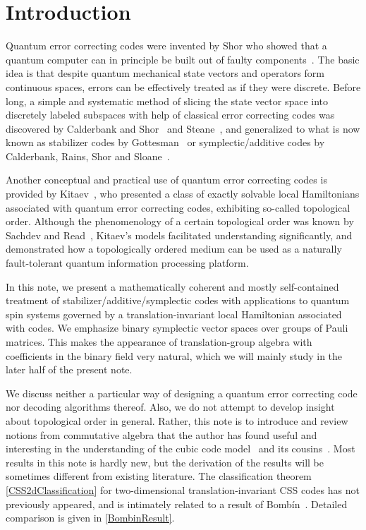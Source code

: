 \section{Introduction}

Quantum error correcting codes were invented by Shor who showed
that a quantum computer can in principle be built
out of faulty components~\cite{Shor1995nine, Shor1996Fault-tolerant}.
The basic idea is that despite 
quantum mechanical state vectors and operators form
continuous spaces,
errors can be effectively treated as if they were discrete.
Before long,
a simple and systematic method of slicing the state vector space
into discretely labeled subspaces with help of classical error correcting codes
was discovered by Calderbank and Shor~\cite{CalderbankShor1996Good} 
and Steane~\cite{Steane1996Multiple},
and generalized to what is now known as 
stabilizer codes by Gottesman~\cite{Gottesman1996Saturating}
or symplectic/additive codes by Calderbank, Rains, Shor and 
Sloane~\cite{CalderbankRainsShorEtAl1997Quantum,CalderbankRainsShorSloane1998GF4}.

Another conceptual and practical use of quantum error correcting codes
is provided by Kitaev~\cite{Kitaev2003Fault-tolerant},
who presented a class of exactly solvable local Hamiltonians
associated with quantum error correcting codes,
exhibiting so-called topological order.
Although the phenomenology of a certain topological order
was known by Sachdev and Read~\cite{ReadSachdev1991LargeN},
Kitaev's models facilitated understanding significantly,
and demonstrated how a topologically ordered medium
can be used as a naturally fault-tolerant quantum information processing platform.

In this note,
we present a mathematically coherent and mostly self-contained treatment
of stabilizer/additive/symplectic codes
with applications to quantum spin systems
governed by a translation-invariant local Hamiltonian associated with codes.
We emphasize binary symplectic vector spaces over groups of Pauli matrices.
This makes the appearance of translation-group algebra with coefficients
in the binary field very natural,
which we will mainly study in the later half of the present note.

We discuss neither 
a particular way of designing a quantum error correcting code
nor decoding algorithms thereof.
Also, we do not attempt to develop insight about topological order in general.
Rather, this note is to introduce and review notions from commutative algebra
that the author has found useful and interesting
in the understanding of the cubic code model~\cite{Haah2011Local} and its 
cousins~\cite{
Chamon2005Quantum,
BravyiLeemhuisTerhal2011Topological,
Kim2012qupit,
Yoshida2013Fractal,
VijayHaahFu2015New,
VijayHaahFu2016Fracton}.
Most results in this note is hardly new,
but the derivation of the results
will be sometimes different from existing literature.
The classification theorem \ref{CSS2dClassification}
for two-dimensional translation-invariant CSS
codes has not previously appeared,
and is intimately related to a result of Bomb\'in~\cite{Bombin2011Structure}.
Detailed comparison is given in \ref{BombinResult}.



